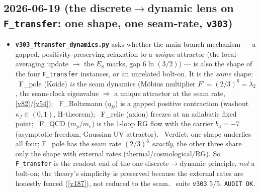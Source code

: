 \subsection*{2026-06-19 (the discrete$\to$dynamic lens on \texttt{F\_transfer}: one shape, one seam-rate, \texttt{v303})}
\begin{itemize}
\item \textbf{\texttt{v303\_ftransfer\_dynamics.py}} asks whether the main-branch mechanism --- a gapped,
  positivity-preserving relaxation to a \emph{unique} attractor (the local-averaging update $\to$ the $E_8$ marks,
  gap $6\ln(3/2)$) --- is also the shape of the four \texttt{F\_transfer} instances, or an unrelated bolt-on. It
  is the \emph{same} shape: \mE\ F\_pole (Koide) \emph{is} the seam dynamics (M\"obius multiplier
  $F'{=}(2/3)^6{=}\lambda_2$, the seam-clock eigenvalue $\Rightarrow$ a unique attractor at the seam rate,
  \vref{v82}/\vref{v54}); \mC\ F\_Boltzmann ($\eta_B$) is a gapped positive contraction (washout
  $\kappa_f\in(0,1)$, H-theorem); \mC\ F\_relic (axion) freezes at an adiabatic fixed point; \mE\ F\_QCD
  ($m_p/m_e$) is the 1-loop RG flow with the carrier $b_3{=}-7$ (asymptotic freedom, Gaussian UV attractor). \mO\
  Verdict: one shape underlies all four; F\_pole has the seam rate $(2/3)^6$ \emph{exactly}, the other three share
  only the shape with external rates (thermal/cosmological/RG). So \texttt{F\_transfer} is the readout end of the
  one discrete$\to$dynamic principle, \emph{not} a bolt-on; the theory's simplicity is preserved because the
  external rates are honestly fenced (\vref{v187}), not reduced to the seam. \mE\ suite \texttt{v303} $5/5$,
  \texttt{AUDIT OK}.
\end{itemize}

